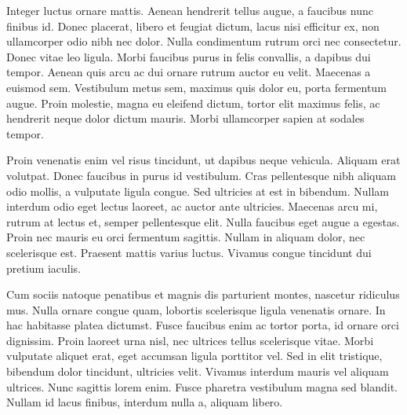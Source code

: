 Integer luctus ornare mattis. Aenean hendrerit tellus augue, a faucibus nunc finibus id. Donec placerat, libero et feugiat dictum, lacus nisi efficitur ex, non ullamcorper odio nibh nec dolor. Nulla condimentum rutrum orci nec consectetur. Donec vitae leo ligula. Morbi faucibus purus in felis convallis, a dapibus dui tempor. Aenean quis arcu ac dui ornare rutrum auctor eu velit. Maecenas a euismod sem. Vestibulum metus sem, maximus quis dolor eu, porta fermentum augue. Proin molestie, magna eu eleifend dictum, tortor elit maximus felis, ac hendrerit neque dolor dictum mauris. Morbi ullamcorper sapien at sodales tempor.

Proin venenatis enim vel risus tincidunt, ut dapibus neque vehicula. Aliquam erat volutpat. Donec faucibus in purus id vestibulum. Cras pellentesque nibh aliquam odio mollis, a vulputate ligula congue. Sed ultricies at est in bibendum. Nullam interdum odio eget lectus laoreet, ac auctor ante ultricies. Maecenas arcu mi, rutrum at lectus et, semper pellentesque elit. Nulla faucibus eget augue a egestas. Proin nec mauris eu orci fermentum sagittis. Nullam in aliquam dolor, nec scelerisque est. Praesent mattis varius luctus. Vivamus congue tincidunt dui pretium iaculis.

Cum sociis natoque penatibus et magnis dis parturient montes, nascetur ridiculus mus. Nulla ornare congue quam, lobortis scelerisque ligula venenatis ornare. In hac habitasse platea dictumst. Fusce faucibus enim ac tortor porta, id ornare orci dignissim. Proin laoreet urna nisl, nec ultrices tellus scelerisque vitae. Morbi vulputate aliquet erat, eget accumsan ligula porttitor vel. Sed in elit tristique, bibendum dolor tincidunt, ultricies velit. Vivamus interdum mauris vel aliquam ultrices. Nunc sagittis lorem enim. Fusce pharetra vestibulum magna sed blandit. Nullam id lacus finibus, interdum nulla a, aliquam libero.
